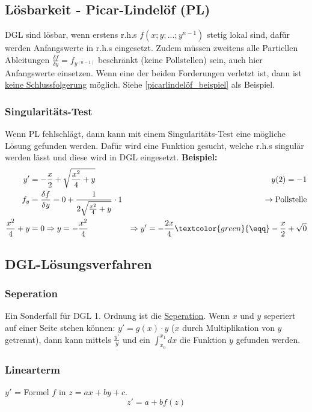 \subsection{Lösbarkeit - Picar-Lindelöf (PL)}\label{picarlindelöf}
DGL sind lösbar, wenn erstens r.h.s $f(x;y;...;y^{n-1})$ stetig lokal sind, dafür werden Anfangswerte in r.h.s eingesetzt. Zudem müssen zweitens alle Partiellen Ableitungen $\frac{\delta f}{\delta y} = f_{y^{(n-1)}}$ beschränkt (keine Pollstellen) sein, auch hier Anfangswerte einsetzen. Wenn eine der beiden Forderungen verletzt ist, dann ist \underline{keine Schlussfolgerung} möglich. Siehe \ref{picarlindelöf_beispiel} als Beispiel.

\subsubsection{Singularitäts-Test}
Wenn PL fehlschlägt, dann kann mit einem Singularitäts-Test eine mögliche Lösung gefunden werden. Dafür wird eine Funktion gesucht, welche r.h.s singulär werden lässt und diese wird in DGL eingesetzt.
\noindent\textbf{Beispiel:}
\begin{align*}
	y' &= -\frac{x}{2} + \sqrt{\frac{x^2}{4} + y} &\qquad y(2) = -1 \\
	f_y &= \frac{\delta f}{\delta y} = 0 + \frac{1}{2\sqrt{\frac{x^2}{4} + y}} \cdot 1  &\to \text{Pollstelle} \\
	\frac{x^2}{4} + y &= 0 \Rightarrow y = -\frac{x^2}{4} &\Rightarrow y' = -\frac{2x}{4} \textcolor{green}{\eqq} -\frac{x}{2} + \sqrt{0}
\end{align*}


\subsection{DGL-Lösungsverfahren}
\subsubsection{Seperation}
Ein Sonderfall für DGL 1. Ordnung ist die \underline{Seperation}. Wenn $x$ und $y$ seperiert auf einer Seite stehen können: $y' = g(x)\cdot y $ ($x$ durch Multiplikation von $y$ getrennt), dann kann mittels $\frac{y'}{y}$ und ein $\int_{x_0}^{x_1}dx$ die Funktion $y$ gefunden werden.

\subsubsection{Linearterm}
$y'$ = Formel $f$ in $z = ax + by + c$.
	\[z' = a + bf(z)\]


